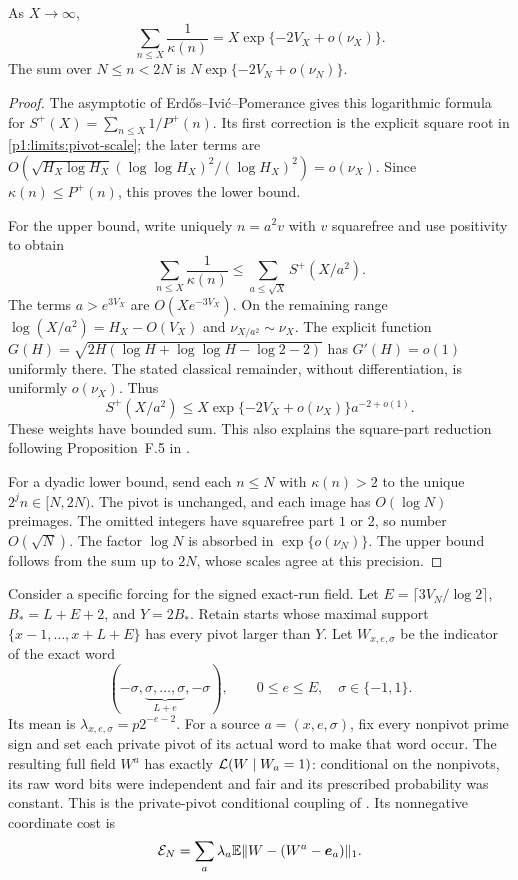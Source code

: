 \begin{lemma}
\label{p1:limits:reciprocal}
As $X\to\infty$,
\begin{equation}
 \sum_{n\le X}\frac1{\kappa(n)}
       =X\exp\{-2V_X+o(\nu_X)\}.
 \label{p1:limits:reciprocal-sum}
\end{equation}
The sum over $N\le n<2N$ is
$N\exp\{-2V_N+o(\nu_N)\}$.
\end{lemma}
\begin{proof}
The asymptotic of Erd\H{o}s--Ivi\'c--Pomerance
\cite[Theorem~1 and equation~(1.3)]{erdosivicpomerance1986}
gives this logarithmic formula for
$S^+(X)=\sum_{n\le X}1/P^+(n)$.
Its first correction is the explicit square root in
\eqref{p1:limits:pivot-scale}; the later terms are
$O(\sqrt{H_X\log H_X}(\log\log H_X)^2/(\log H_X)^2)=o(\nu_X)$.
Since $\kappa(n)\le P^+(n)$, this proves the lower bound.

For the upper bound, write uniquely $n=a^2v$ with $v$
squarefree and use positivity to obtain
\[
 \sum_{n\le X}\frac1{\kappa(n)}
       \le\sum_{a\le\sqrt X}S^+(X/a^2).
\]
The terms $a>e^{3V_X}$ are $O(Xe^{-3V_X})$.
On the remaining range $\log(X/a^2)=H_X-O(V_X)$ and
$\nu_{X/a^2}\sim\nu_X$.  The explicit function
$G(H)=\sqrt{2H(\log H+\log\log H-\log2-2)}$ has
$G'(H)=o(1)$ uniformly there.  The stated classical remainder,
without differentiation, is uniformly $o(\nu_X)$.
Thus
\[
 S^+(X/a^2)\le
 X\exp\{-2V_X+o(\nu_X)\}a^{-2+o(1)}.
\]
These weights have bounded sum.  This also explains the
square-part reduction following Proposition~F.5 in
\cite{pouly2026c}.

For a dyadic lower bound, send each $n\le N$ with
$\kappa(n)>2$ to the unique $2^jn\in[N,2N)$.
The pivot is unchanged, and each image has $O(\log N)$
preimages.  The omitted integers have squarefree part $1$ or
$2$, so number $O(\sqrt N)$.  The factor $\log N$ is absorbed
in $\exp\{o(\nu_N)\}$.  The upper bound follows from the sum
up to $2N$, whose scales agree at this precision.
\end{proof}

Consider a specific forcing for the signed exact-run field.
Let
$E=\lceil3V_N/\log2\rceil$, $B_*=L+E+2$, and
$Y=2B_*$.  Retain starts whose maximal support
$\{x-1,\ldots,x+L+E\}$ has every pivot larger than $Y$.
Let $W_{x,e,\sigma}$ be the indicator of the exact word
\[
 (-\sigma,\underbrace{\sigma,\ldots,\sigma}_{L+e},-\sigma),
 \qquad 0\le e\le E,\quad \sigma\in\{-1,1\}.
\]
Its mean is $\lambda_{x,e,\sigma}=p2^{-e-2}$.
For a source $a=(x,e,\sigma)$, fix every nonpivot prime sign
and set each private pivot of its actual word to make that
word occur.  The resulting full field $W^a$ has exactly
$\mathcal L(W\mid W_a=1)$: conditional on the nonpivots, its raw
word bits were independent and fair and its prescribed
probability was constant.  This is the private-pivot
conditional coupling of \cite[Proposition~F.7]{pouly2026c}.
Its nonnegative coordinate cost is
\[
 \mathcal E_N
       =\sum_a\lambda_a
               \mathbb E\|W-(W^a-\boldsymbol e_a)\|_1.
\]

